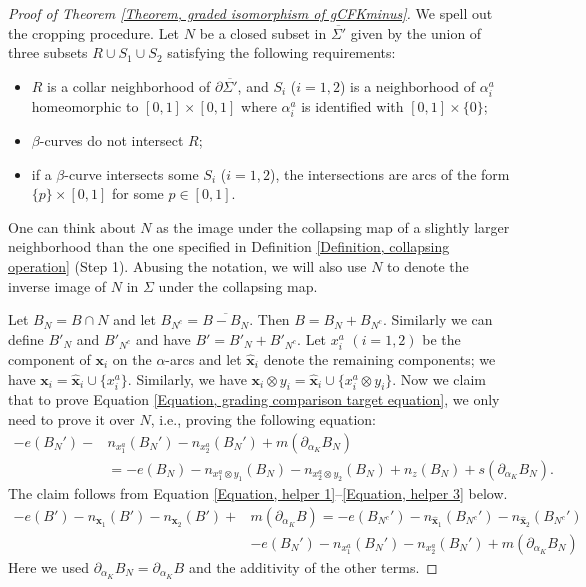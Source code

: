 \documentclass{amsart}
\theoremstyle{definition}
\theoremstyle{remark}
\numberwithin{equation}{section}
\numberwithin{equation}{section} \makeatletter
\begin{document}
\begin{proof}[Proof of Theorem \ref{Theorem, graded isomorphism of gCFKminus}]
We spell out the cropping procedure. Let $N$ be a closed subset in $\overline{\Sigma'}$ given by the union of three subsets $R\cup S_1\cup S_2$ satisfying the following requirements: 
\begin{itemize}
\item[(1)] $R$ is a collar neighborhood of $\partial\overline{\Sigma'}$, and $S_i$ ($i=1,2$) is a neighborhood of $\alpha^a_i$ homeomorphic to $[0,1]\times[0,1]$ where $\alpha_i^a$ is identified with $[0,1]\times\{0\}$;
\item[(2)] $\beta$-curves do not intersect $R$;
\item[(3)] if a $\beta$-curve intersects some $S_i$ ($i=1,2$), the intersections are arcs of the form $\{p\}\times[0,1]$ for some $p\in[0,1]$. 
\end{itemize} 

One can think about $N$ as the image under the collapsing map of a slightly larger neighborhood than the one specified in Definition \ref{Definition, collapsing operation} (Step 1). Abusing the notation, we will also use $N$ to denote the inverse image of $N$ in $\Sigma$ under the collapsing map.

Let $B_N=B\cap N$ and let $B_{N^c}=\overline{B-B_N}$. Then $B=B_N+B_{N^c}$. Similarly we can define $B'_N$ and $B'_{N^c}$ and have $B'=B'_N+B'_{N^c}$. Let $x_i^a$ $(i=1,2)$ be the component of $\bm{x}_i$ on the $\alpha$-arcs and let $\hat{\bm{x}}_i$ denote the remaining components; we have $\bm{x}_i=\hat{\bm{x}}_i\cup \{x_i^a\}$. Similarly, we have $\bm{x}_i\otimes y_i=\hat{\bm{x}}_i\cup \{x_i^a\otimes y_i\}$. Now we claim that to prove Equation \ref{Equation, grading comparison target equation}, we only need to prove it over $N$, i.e., proving the following equation:
\begin{equation}\label{Equation, grading comparsion equation cropped}
\begin{aligned}
	-e(B_N')-&n_{x_1^a}(B_N')-n_{x_2^a}(B_N')+m(\partial_{\alpha_K}B_N)\\&=-e(B_N)-n_{x_1^a \otimes y_1}(B_N)-n_{x_2^a \otimes y_2}(B_N)+n_z(B_N)+s(\partial_{\alpha_{K}}B_N).
\end{aligned}
\end{equation}
The claim follows from Equation \ref{Equation, helper 1}--\ref{Equation, helper 3} below.
\begin{equation}\label{Equation, helper 1}
	\begin{aligned}
-e(B')-n_{\bm{x}_1}(B')-n_{\bm{x}_2}(B')+&m(\partial_{\alpha_K}B)=-e(B_{N^c}')-n_{\hat{\bm{x}}_1}(B_{N^c}')-n_{\hat{\bm{x}}_2}(B_{N^c}')\\
&-e(B_N')-n_{x_1^a}(B_N')-n_{x_2^a}(B_N')+m(\partial_{\alpha_K}B_N)
	\end{aligned}
\end{equation}
Here we used $\partial_{\alpha_K}B_N= \partial_{\alpha_K}B$ and the additivity of the other terms.


\end{proof}
\end{document}
